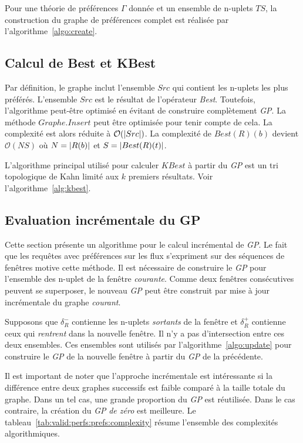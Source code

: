 Pour une théorie de préférences $\Gamma$ donnée et un ensemble de n-uplets $TS$, la construction du graphe de préférences complet est réalisée par l'algorithme~\ref{algo:create}.

\subsection{Calcul de Best et KBest}
Par définition, le graphe inclut l'ensemble $Src$ qui contient les n-uplets les plus préférés. L'ensemble $Src$ est le résultat de l'opérateur \textit{Best}. Toutefois, l'algorithme peut-être optimisé en évitant de construire complètement \textit{GP}. La méthode $Graphe.Insert$ peut être optimisée pour tenir compte de cela. 
La complexité est alors réduite à $\mathcal O(\left| Src \right|)$. La complexité de $Best(R)(b)$ devient $\mathcal O(NS)$ où $N = \left| R(b) \right|$ et $S=\left| Best(R)(t) \right|$.

L'algorithme principal utilisé pour calculer $KBest$ à partir du \textit{GP} est un tri topologique de Kahn limité aux $k$ premiers résultats. Voir l'algorithme~\ref{alg:kbest}.

\subsection{Evaluation incrémentale du GP}
Cette section présente un algorithme pour le calcul incrémental de \textit{GP}. Le fait que les requêtes avec préférences sur les flux s'expriment sur des séquences de fenêtres motive cette méthode. Il est nécessaire de construire le \textit{GP} pour l'ensemble des n-uplet de la fenêtre \textit{courante}. Comme deux fenêtres consécutives peuvent se superposer, le nouveau \textit{GP} peut être construit par mise à jour incrémentale du graphe \textit{courant}. 

Supposons que $\delta_R^{-}$ contienne les n-uplets \textit{sortants} de la fenêtre et $\delta_R^{+}$ contienne ceux qui \textit{rentrent} dans la nouvelle fenêtre. Il n'y a pas d'intersection entre ces deux ensembles. Ces ensembles sont utilisés par l'algorithme~\ref{algo:update} pour construire le \textit{GP} de la nouvelle fenêtre à partir du \textit{GP} de la précédente. 

Il est important de noter que l'approche incrémentale est intéressante si la différence entre deux graphes successifs est faible comparé à la taille totale du graphe. Dans un tel cas, une grande proportion du \textit{GP} est réutilisée. Dans le cas contraire, la création du \textit{GP} \textit{de zéro} est meilleure. Le tableau~\ref{tab:valid:perfs:prefs:complexity} résume l'ensemble des complexités algorithmiques.

